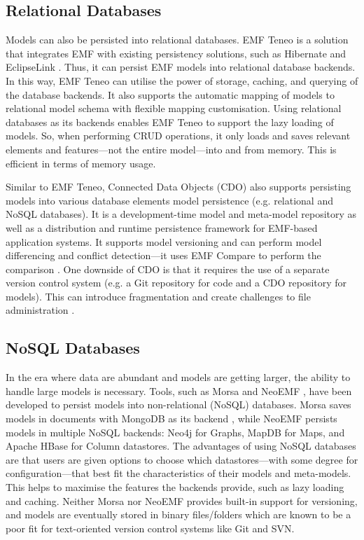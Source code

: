 \subsection{Relational Databases}
\label{sec:relational_databases}
Models can also be persisted into relational databases. EMF Teneo \cite{eclipse2017teneo} is a solution that integrates EMF with existing persistency solutions, such as Hibernate \cite{hibernate2019hibernateorm} and EclipseLink \cite{eclipse2019eclipselink}. Thus, it can persist EMF models into relational database backends. In this way, EMF Teneo can utilise the power of storage, caching, and querying of the database backends. It also supports the automatic mapping of models to relational model schema with flexible mapping customisation. Using relational databases as its backends enables EMF Teneo to support the lazy loading of models. So, when performing CRUD operations, it only loads and saves relevant elements and features—not the entire model—into and from memory. This is efficient in terms of memory usage.

Similar to EMF Teneo, Connected Data Objects (CDO) \cite{eclipse2019cdo} also supports persisting models into various database elements model persistence (e.g. relational and NoSQL databases). It is a development-time model and meta-model repository as well as a distribution and runtime persistence framework for EMF-based application systems. It supports model versioning and can perform model differencing and conflict detection—it uses EMF Compare \cite{emfcompare2018developer} to perform the comparison \cite{cdo2019emfcompare}. One downside of CDO is that it requires the use of a separate version control system (e.g. a Git repository for code and a CDO repository for models). This can introduce fragmentation and create challenges to file administration \cite{barmpis2014evaluation}.

\subsection{NoSQL Databases}
\label{sec:NoSQL Databases}
In the era where data are abundant and models are getting larger, the ability to handle large models is necessary. Tools, such as Morsa \cite{DBLP:conf/models/Espinazo-PaganCM11} and NeoEMF \cite{daniel2016neoemf}, have been developed to persist models into non-relational (NoSQL) databases. Morsa saves models in documents with MongoDB as its backend \cite{mongodb}, while NeoEMF persists models in multiple NoSQL backends: Neo4j \cite{neo4j2019neo4j} for Graphs, MapDB \cite{mapdb2019mapdb} for Maps, and Apache HBase \cite{apache2019hbase} for Column datastores. The advantages of using NoSQL databases are that users are given options to choose which datastores—with some degree for configuration—that best fit the characteristics of their models and meta-models. This helps to maximise the features the backends provide, such as lazy loading and caching. Neither Morsa nor NeoEMF provides built-in support for versioning, and models are eventually stored in binary files/folders which are known to be a poor fit for text-oriented version control systems like Git and SVN.

